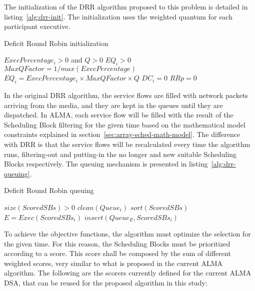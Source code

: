 The initialization of the DRR algorithm proposed to this problem is detailed in listing~\ref{alg:drr-init}. The initialization uses the weighted quantum for each participant executive.

\begin{algorithm}                     
\caption{Deficit Round Robin initialization}          
\label{alg:drr-init}                   
\begin{algorithmic}                    
    \REQUIRE $ExecPercentage_i > 0$ and $Q > 0$
    \ENSURE $EQ_i > 0$
    \STATE $MaxQFactor = 1 / max(ExecPercentage)$
    \STATE $EQ_i = ExecPercentage_i\times MaxQFactor \times Q$
    \STATE $DC_i = 0$ 
    \STATE $RRp = 0$ 
    \ENDFOR
\end{algorithmic}
\end{algorithm}

In the original DRR algorithm, the service flows are filled with network packets arriving from the media, and they are kept in the queues until they are dispatched. In ALMA, each service flow will be filled with the result of the Scheduling Block filtering for the given time based on the mathematical model constraints explained in section~\ref{sec:array-sched-math-model}. The difference with DRR is that the service flows will be recalculated every time the algorithm runs, filtering-out and putting-in the no longer and new suitable Scheduling Blocks respectively. The queuing mechanism is presented in listing~\ref{alg:drr-queuing}.

\begin{algorithm}                     
\caption{Deficit Round Robin queuing}          
\label{alg:drr-queuing}                   
\begin{algorithmic}                    
    \REQUIRE $size(ScoredSBs) > 0$
    \STATE $clean(Queue_i)$
    \ENDFOR
    \STATE $sort(ScoredSBs)$
    \STATE $E = Exec(ScoredSBs_i)$
    \STATE $insert(Queue_E, ScoredSBs_i)$
    \ENDFOR
\end{algorithmic}
\end{algorithm}

To achieve the objective functions, the algorithm must optimize the selection for the given time. For this reason, the Scheduling Blocks must be prioritized according to a score. This score shall be composed by the sum of different weighted scores, very similar to what is proposed in the current ALMA algorithm. The following are the scorers currently defined for the current ALMA DSA, that can be reused for the proposed algorithm in this study:

